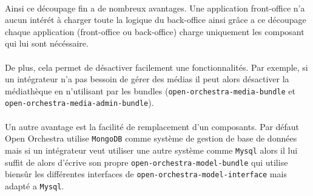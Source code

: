    \paragraph{}
   Ainsi ce découpage fin a de nombreux avantages. Une application front-office n'a aucun intérét à charger toute la logique du back-office ainsi grâce a ce découpage chaque application (front-office ou back-office) charge uniquement les composant qui lui sont nécéssaire.
   \paragraph{}
   De plus, cela permet de désactiver facilement une fonctionnalités. Par exemple, si un intégrateur n'a pas bessoin de gérer des médias il peut alors désactiver la médiathèque en n'utilisant par les bundles (\verb?open-orchestra-media-bundle? et \verb?open-orchestra-media-admin-bundle?).

   \paragraph{}
   Un autre avantage est la facilité de remplacement d'un composants. Par défaut Open Orchestra utilise \verb?MongoDB? comme système de gestion de base de données mais si un intégrateur veut utiliser une autre système comme \verb?Mysql? alors il lui suffit de alors d'écrive son propre \verb?open-orchestra-model-bundle? qui utilise biensûr les différentes interfaces de \verb?open-orchestra-model-interface? mais adapté a \verb?Mysql?.